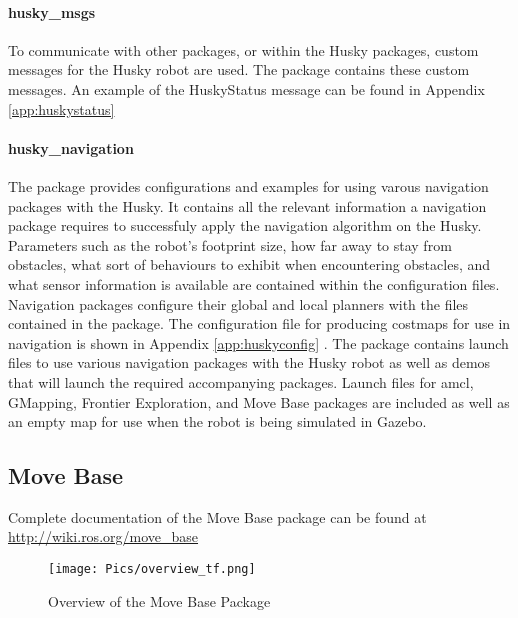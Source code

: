 \paragraph{husky\_msgs}

To communicate with other packages, or within the Husky packages, custom messages for the Husky robot are used. The  package contains these custom messages. An example of the HuskyStatus message can be found in Appendix \ref{app:huskystatus}


\paragraph{husky\_navigation}

The  package provides configurations and examples for using varous navigation packages with the Husky. It contains all the relevant information a navigation package requires to successfuly apply the navigation algorithm on the Husky. Parameters such as the robot's footprint size, how far away to stay from obstacles, what sort of behaviours to exhibit when encountering obstacles, and what sensor information is available are contained within the configuration files. Navigation packages configure their global and local planners with the files contained in the  package. The configuration file for producing costmaps for use in navigation is shown in Appendix \ref{app:huskyconfig} . The package contains launch files to use various navigation packages with the Husky robot as well as demos that will launch the required accompanying packages. Launch files for \acrshort{amcl}, GMapping, Frontier Exploration, and Move Base packages are included as well as an empty map for use when the robot is being simulated in Gazebo.\\ 
\clearpage
\subsection{Move Base}

Complete documentation of the Move Base package can be found at \url{http://wiki.ros.org/move_base}\\

\begin{figure}[H]
    \centering
    \texttt{[image: Pics/overview\_tf.png]}
    \caption{Overview of the Move Base Package \cite{rosmovebase}}
    \label{fig:movebaseoverview}
\end{figure}

